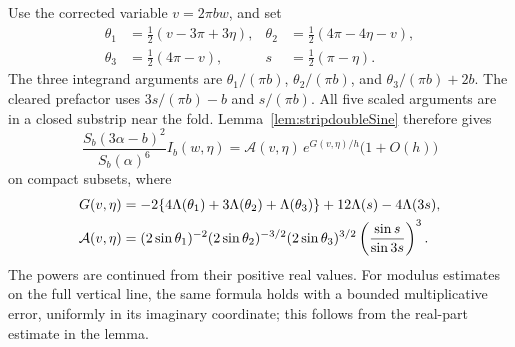 \documentclass[11pt,a4paper]{article}
\numberwithin{equation}{section}
\theoremstyle{definition}
\theoremstyle{remark}
\begin{document}
Use the corrected variable $v=2\pi bw$, and set
\begin{equation}
 \begin{aligned}
 \theta_1&=\tfrac12(v-3\pi+3\eta),&
 \theta_2&=\tfrac12(4\pi-4\eta-v),\\
 \theta_3&=\tfrac12(4\pi-v),&
 s&=\tfrac12(\pi-\eta).
 \end{aligned}
 \label{eq:regularstripangles}
\end{equation}
The three integrand arguments are
$\theta_1/(\pi b)$, $\theta_2/(\pi b)$, and
$\theta_3/(\pi b)+2b$.
The cleared prefactor uses $3s/(\pi b)-b$ and $s/(\pi b)$.
All five scaled arguments are in a closed substrip near the fold.
Lemma~\ref{lem:stripdoubleSine} therefore gives
\begin{equation}
 \frac{S_b(3\alpha-b)^2}{S_b(\alpha)^6}I_b(w,\eta)
 =
 \mathcal A(v,\eta)\,e^{G(v,\eta)/h}
 \bigl(1+O(h)\bigr)
 \label{eq:fullsmoothquantumphase}
\end{equation}
on compact subsets, where
\begin{align}
 G(v,\eta)
 &=-2\{4\Lambda(\theta_1)+3\Lambda(\theta_2)
                              +\Lambda(\theta_3)\}
        +12\Lambda(s)-4\Lambda(3s),\notag\\
 \mathcal A(v,\eta)
 &=(2\sin\theta_1)^{-2}(2\sin\theta_2)^{-3/2}
   (2\sin\theta_3)^{3/2}
   \left(\frac{\sin s}{\sin3s}\right)^3.
 \label{eq:clearedphaseamplitude}
\end{align}
The powers are continued from their positive real values.
For modulus estimates on the full vertical line, the same formula
holds with a bounded multiplicative error, uniformly in its
imaginary coordinate; this follows from the real-part estimate
in the lemma.
\end{document}
